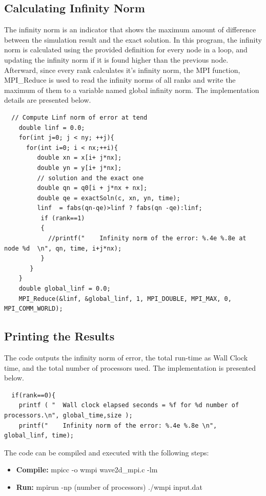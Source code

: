 \documentclass[12pt]{article}
\begin{document}
\subsection{Calculating Infinity Norm}
The infinity norm is an indicator that shows the maximum amount of difference between the simulation result and the exact solution. In this program, the infinity norm is calculated using the provided definition for every node in a loop, and updating the infinity norm if it is found higher than the previous node. Afterward, since every rank calculates it's infinity norm, the MPI function, MPI\_Reduce is used to read the infinity norms of all ranks and write the maximum of them to a variable named global infinity norm. The implementation details are presented below.
\begin{verbatim}
  // Compute Linf norm of error at tend
    double linf = 0.0; 
    for(int j=0; j < ny; ++j){ 
      for(int i=0; i < nx;++i){
         double xn = x[i+ j*nx]; 
         double yn = y[i+ j*nx]; 
         // solution and the exact one
         double qn = q0[i + j*nx + nx]; 
         double qe = exactSoln(c, xn, yn, time);  
         linf  = fabs(qn-qe)>linf ? fabs(qn -qe):linf;
          if (rank==1)
          {
            //printf("    Infinity norm of the error: %.4e %.8e at node %d  \n", qn, time, i+j*nx);
          }
       }
    }
    double global_linf = 0.0;
    MPI_Reduce(&linf, &global_linf, 1, MPI_DOUBLE, MPI_MAX, 0, MPI_COMM_WORLD);
    \end{verbatim}
    
\subsection{Printing the Results}
The code outputs the infinity norm of error, the total run-time as Wall Clock time, and the total number of processors used. The implementation is presented below.
\begin{verbatim}
  if(rank==0){
    printf ( "  Wall clock elapsed seconds = %f for %d number of processors.\n", global_time,size );
    printf("    Infinity norm of the error: %.4e %.8e \n", global_linf, time);
    \end{verbatim}
The code can be compiled and executed with the following steps:
\begin{itemize}
    \item \textbf{Compile:} mpicc -o wmpi wave2d\_mpi.c -lm
    \item \textbf{Run:} mpirun -np (number of processors) ./wmpi input.dat
\end{itemize}
\end{document}
